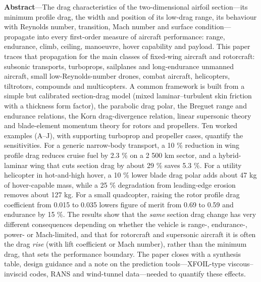 \documentclass[10pt,a4paper,twocolumn]{article}
\begin{document}
\thispagestyle{plain}
\begingroup\small\bfseries

\textbf{Abstract}---The drag characteristics of the two-dimensional
airfoil section---its minimum profile drag, the width and position of
its low-drag range, its behaviour with Reynolds number, transition, Mach
number and surface condition---propagate into every first-order measure
of aircraft performance: range, endurance, climb, ceiling, manoeuvre,
hover capability and payload. This paper traces that propagation for the
main classes of fixed-wing aircraft and rotorcraft: subsonic transports,
turboprops, sailplanes and long-endurance unmanned aircraft, small
low-Reynolds-number drones, combat aircraft, helicopters, tiltrotors,
compounds and multicopters. A common framework is built from a simple
but calibrated section-drag model (mixed laminar--turbulent skin
friction with a thickness form factor), the parabolic drag polar, the
Breguet range and endurance relations, the Korn drag-divergence
relation, linear supersonic theory and blade-element momentum theory for
rotors and propellers. Ten worked examples (A--J), with supporting
turboprop and propeller cases, quantify the sensitivities. For a generic
narrow-body transport, a 10 \% reduction in wing profile drag reduces
cruise fuel by 2.3 \% on a 2 500 km sector, and a hybrid-laminar wing
that cuts section drag by about 29 \% saves 5.3 \%. For a utility
helicopter in hot-and-high hover, a 10 \% lower blade drag polar adds
about 47 kg of hover-capable mass, while a 25 \% degradation from
leading-edge erosion removes about 127 kg. For a small quadcopter,
raising the rotor profile drag coefficient from 0.015 to 0.035 lowers
figure of merit from 0.69 to 0.59 and endurance by 15 \%. The results
show that the \emph{same} section drag change has very different
consequences depending on whether the vehicle is range-, endurance-,
power- or Mach-limited, and that for rotorcraft and supersonic aircraft
it is often the drag \emph{rise} (with lift coefficient or Mach number),
rather than the minimum drag, that sets the performance boundary. The
paper closes with a synthesis table, design guidance and a note on the
prediction tools---XFOIL-type viscous--inviscid codes, RANS and
wind-tunnel data---needed to quantify these effects.
\end{document}
